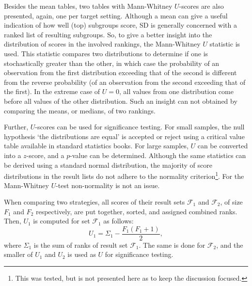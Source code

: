 \documentclass[smallextended]{svjour3}
\newcommand{\sd}{SD}
\begin{document}
Besides the mean tables, two tables with Mann-Whitney $U$-scores \cite{mann-whitney:1947} are also presented, again, one per target setting.
Although a mean can give a useful indication of how well (top) subgroups score, \sd{} is generally concerned with a ranked list of resulting subgroups.
So, to give a better insight into the distribution of scores in the involved rankings, the Mann-Whitney $U$ statistic is used.
This statistic compares two distributions to determine if one is stochastically greater than the other, in which case the probability of an observation from the first distribution exceeding that of the second is different from the reverse probability (of an observation from the second exceeding that of the first).
In the extreme case of $U = 0$, all values from one distribution come before all values of the other distribution.
Such an insight can not obtained by comparing the means, or medians, of two rankings.

Further, $U$-scores can be used for significance testing.
For small samples, the null hypothesis `the distributions are equal' is accepted or reject using a critical value table available in standard statistics books.
For large samples, $U$ can be converted into a $z$-score, and a $p$-value can be determined.
Although the same statistics can be derived using a standard normal distribution, the majority of score distributions in the result lists do not adhere to the normality criterion\footnote{This was tested, but is not presented here as to keep the discussion focused.}.
For the Mann-Whitney $U$-test non-normality is not an issue.

When comparing two strategies, all scores of their result sets $\mathcal{F}_1$ and $\mathcal{F}_2$, of size $F_1$ and $F_2$ respectively, are put together, sorted, and assigned combined ranks.
Then, $U_1$ is computed for set $\mathcal{F}_1$ as follows:
\begin{equation}
\label{equation:mann-whitney-U}
  U_1 = \Sigma_1 - \frac{F_1 \left(F_1 + 1 \right)}{2},
\end{equation}
where $\Sigma_1$ is the sum of ranks of result set $\mathcal{F}_1$.
The same is done for $\mathcal{F}_2$, and the smaller of $U_1$ and $U_2$ is used as $U$ for significance testing.
\end{document}
